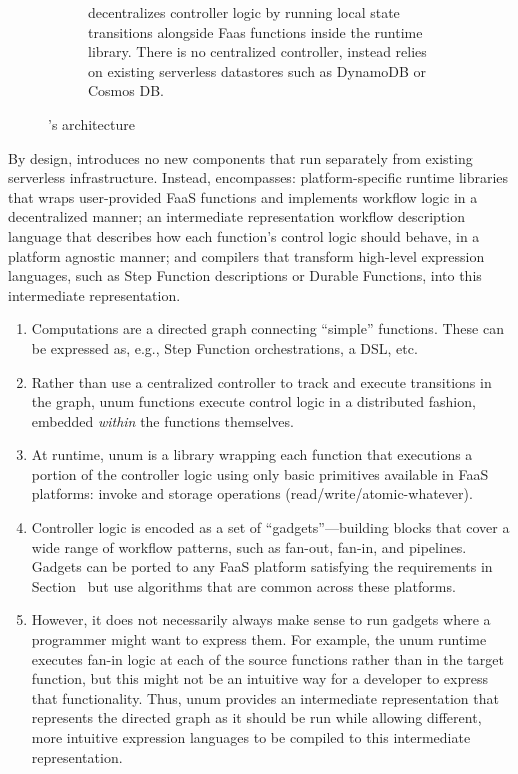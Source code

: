 \begin{figure}[t]
\begin{subfigure}[b]{\columnwidth}
        \caption{\name{} decentralizes controller logic by running local state
                 transitions alongside Faas functions inside the \name{} runtime
                library. There is no centralized controller, instead \name{} relies on existing
                serverless datastores such as DynamoDB or Cosmos DB.}
        \label{fig:arch:unum}
    \end{subfigure}
    \caption{\name{}'s architecture}
\end{figure}

By design, \name{} introduces no new components that run separately from
existing serverless infrastructure. Instead, \name{} encompasses:
platform-specific runtime libraries that wraps user-provided FaaS functions and
implements workflow logic in a decentralized manner; an intermediate
representation workflow description language that describes how each function's
control logic should behave, in a platform agnostic manner; and compilers that
transform high-level expression languages, such as Step Function descriptions or
Durable Functions, into this intermediate representation.

\begin{enumerate}
  \item Computations are a directed graph connecting ``simple'' functions. These
        can be expressed as, e.g., Step Function orchestrations, a DSL, etc.
  \item Rather than use a centralized controller to track and execute
        transitions in the graph, unum functions execute control logic in a distributed
        fashion, embedded \emph{within} the functions themselves.
  \item At runtime, unum is a library wrapping each function that executions a
        portion of the controller logic using only basic primitives available in FaaS
        platforms: invoke and storage operations (read/write/atomic-whatever).
  \item Controller logic is encoded as a set of ``gadgets''---building blocks
        that cover a wide range of workflow patterns, such as fan-out, fan-in,
        and pipelines. Gadgets can be ported to any FaaS platform satisfying the
        requirements in Section~\label{sec:motivation} but use algorithms that
        are common across these platforms.
  \item However, it does not necessarily always make sense to run gadgets where
        a programmer might want to express them. For example, the unum runtime executes
        fan-in logic at each of the source functions rather than in the target function,
        but this might not be an intuitive way for a developer to express that
        functionality. Thus, unum provides an intermediate representation that
        represents the directed graph as it should be run while allowing different, more
        intuitive expression languages to be compiled to this intermediate
        representation.
\end{enumerate}

